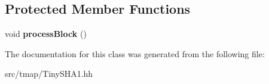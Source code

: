 \subsection*{Protected Member Functions}
\begin{DoxyCompactItemize}
\item 
\mbox{\label{classsha1_1_1SHA1_af00112a350d5f1f67a9ac00a0fee6793}} 
void {\bfseries process\+Block} ()
\end{DoxyCompactItemize}


The documentation for this class was generated from the following file\+:\begin{DoxyCompactItemize}
\item 
src/tmap/Tiny\+S\+H\+A1.\+hh\end{DoxyCompactItemize}
